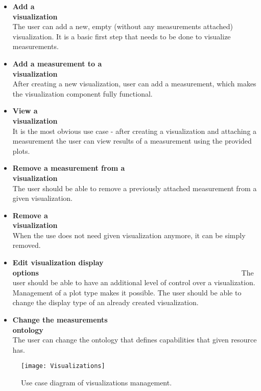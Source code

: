 \begin{itemize}

\item {\bf Add a visualization}~~~~~~~~~~~~~~~~~~~~~~~~~~~~~~~~~~~~~~~~~~~~~~~~~~~~~~~~\linebreak
The user can add a new, empty (without any measurements attached) visualization. It is a basic first step that needs to be done to visualize measurements.

\item {\bf Add a measurement to a visualization}~~~~~~~~~~~~~~~~~~~~~~~~~~~~~~~~~~~~~~~~~~~~~~~~~~~~~~~~\linebreak
After creating a new visualization, user can add a measurement, which makes the visualization component fully functional.

\item {\bf View a visualization}~~~~~~~~~~~~~~~~~~~~~~~~~~~~~~~~~~~~~~~~~~~~~~~~~~~~~~~~\linebreak
It is the most obvious use case - after creating a visualization and attaching a measurement the user can view results of a measurement using the provided plots.

\item {\bf Remove a measurement from a visualization}~~~~~~~~~~~~~~~~~~~~~~~~~~~~~~~~~~~~~~~~~~~~~~~~~~~~~~~~\linebreak
The user should be able to remove a previously attached measurement from a given visualization.

\item {\bf Remove a visualization}~~~~~~~~~~~~~~~~~~~~~~~~~~~~~~~~~~~~~~~~~~~~~~~~~~~~~~~~\linebreak
When the use does not need given visualization anymore, it can be simply removed.

\item {\bf Edit  visualization display options}~~~~~~~~~~~~~~~~~~~~~~~~~~~~~~~~~~~~~~~~~~~~~~~~~~~~~~~~\linebreak
The user should be able to have an additional level of control over a visualization. Management of a plot type makes it possible. The user should be able to change the display type of an already created visualization.

\item {\bf Change the measurements ontology}~~~~~~~~~~~~~~~~~~~~~~~~~~~~~~~~~~~~~~~~~~~~~~~~~~~~~~~~\linebreak
The user can change the ontology that defines capabilities that given resource has.

\end{itemize}

\begin{figure}[ht]
\centering
\texttt{[image: Visualizations]}
\caption{Use case diagram of visualizations management.}
\label{fig:usecases_visualisations}
\end{figure}
